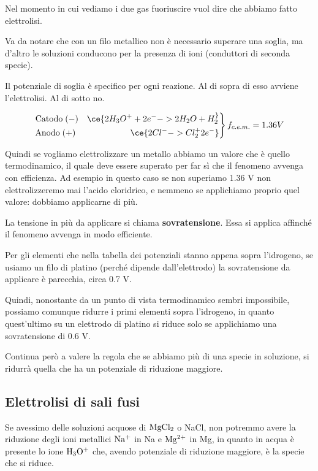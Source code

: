 Nel momento in cui vediamo i due gas fuoriuscire vuol dire che abbiamo fatto elettrolisi.

Va da notare che con un filo metallico non è necessario superare una soglia, ma d'altro le soluzioni conducono per la presenza di ioni (conduttori di seconda specie).

Il potenziale di soglia è specifico per ogni reazione. Al di sopra di esso avviene l'elettrolisi. Al di sotto no.

\begin{equation*}
    \left.\begin{aligned}
    \text{Catodo} \; (-) \quad \ce{2H_3O^+ + 2e^- -> 2H_2O + H_2 ^}\\
    \text{Anodo} \; (+) \hspace{1.9cm} \quad \ce{2Cl^- -> Cl_2 ^ + 2 e^-}
  \end{aligned}\right\} f_{c.e.m.}=1.36 V
\end{equation*}

Quindi se vogliamo elettrolizzare un metallo abbiamo un valore che è quello termodinamico, il quale deve essere superato per far sì che il fenomeno avvenga con efficienza. Ad esempio in questo caso se non superiamo 1.36 V non elettrolizzeremo mai l'acido cloridrico, e nemmeno se applichiamo proprio quel valore: dobbiamo applicarne di più. 

La tensione in più da applicare si chiama \textbf{sovratensione}. Essa si applica affinché il fenomeno avvenga in modo efficiente.

Per gli elementi che nella tabella dei potenziali stanno appena sopra l'idrogeno, se usiamo un filo di platino (perché dipende dall'elettrodo) la sovratensione da applicare è parecchia, circa 0.7 V.

Quindi, nonostante da un punto di vista termodinamico sembri impossibile, possiamo comunque ridurre i primi elementi sopra l'idrogeno, in quanto quest'ultimo su un elettrodo di platino si riduce solo se applichiamo una sovratensione di 0.6 V.

Continua però a valere la regola che se abbiamo più di una specie in soluzione, si ridurrà quella che ha un potenziale di riduzione maggiore.

\subsection{Elettrolisi di sali fusi}

Se avessimo delle soluzioni acquose di $\rm MgCl_2$ o NaCl, non potremmo avere la riduzione degli ioni metallici $\rm Na^+$ in Na e $\rm Mg^{2+}$ in Mg, in quanto in acqua è presente lo ione $\rm H_3O^+$ che, avendo potenziale di riduzione maggiore, è la specie che si riduce.

